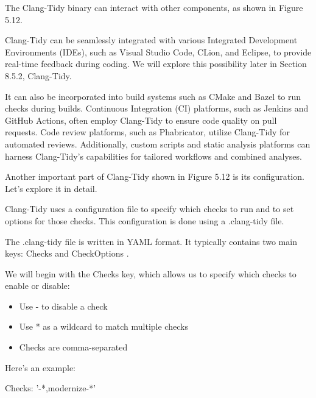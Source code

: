 
The Clang-Tidy binary can interact with other components, as shown in Figure 5.12.


Clang-Tidy can be seamlessly integrated with various Integrated Development Environments (IDEs), such as Visual Studio Code, CLion, and Eclipse, to provide real-time feedback during coding. We will explore this possibility later in Section 8.5.2, Clang-Tidy.

It can also be incorporated into build systems such as CMake and Bazel to run checks during builds. Continuous Integration (CI) platforms, such as Jenkins and GitHub Actions, often employ Clang-Tidy to ensure code quality on pull requests. Code review platforms, such as Phabricator, utilize Clang-Tidy for automated reviews. Additionally, custom scripts and static analysis platforms can harness Clang-Tidy's capabilities for tailored workflows and combined analyses.

Another important part of Clang-Tidy shown in Figure 5.12 is its configuration. Let's explore it in detail.


Clang-Tidy uses a configuration file to specify which checks to run and to set options for those checks. This configuration is done using a .clang-tidy file.

The .clang-tidy file is written in YAML format. It typically contains two main keys: Checks and CheckOptions .

We will begin with the Checks key, which allows us to specify which checks to enable or disable:

\begin{itemize}
\item
Use - to disable a check

\item
Use * as a wildcard to match multiple checks

\item
Checks are comma-separated
\end{itemize}

Here's an example:

\begin{shell}
Checks: '-*,modernize-*'
\end{shell}

